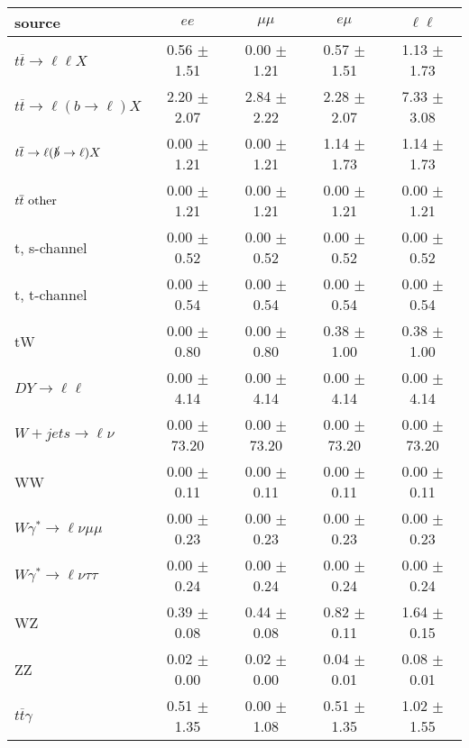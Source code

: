 \begin{tabular}{l|cccc} \hline\hline
source & $ee$ & $\mu\mu$ & $e\mu$ & $\ell\ell $ \\
\hline
$t\overline{t} \rightarrow \ell \ell X$ &  0.56 $\pm$  1.51 &  0.00 $\pm$  1.21 &  0.57 $\pm$  1.51 &  1.13 $\pm$  1.73 \\
$t\overline{t} \rightarrow \ell (b \rightarrow \ell) X$ &  2.20 $\pm$  2.07 &  2.84 $\pm$  2.22 &  2.28 $\pm$  2.07 &  7.33 $\pm$  3.08 \\
$t\overline{t} \rightarrow \ell (\slashed b \rightarrow \ell) X$ &  0.00 $\pm$  1.21 &  0.00 $\pm$  1.21 &  1.14 $\pm$  1.73 &  1.14 $\pm$  1.73 \\
        $t\overline{t}\ \rm{other}$ &  0.00 $\pm$  1.21 &  0.00 $\pm$  1.21 &  0.00 $\pm$  1.21 &  0.00 $\pm$  1.21 \\
\hline
                       t, s-channel &  0.00 $\pm$  0.52 &  0.00 $\pm$  0.52 &  0.00 $\pm$  0.52 &  0.00 $\pm$  0.52 \\
                       t, t-channel &  0.00 $\pm$  0.54 &  0.00 $\pm$  0.54 &  0.00 $\pm$  0.54 &  0.00 $\pm$  0.54 \\
                                 tW &  0.00 $\pm$  0.80 &  0.00 $\pm$  0.80 &  0.38 $\pm$  1.00 &  0.38 $\pm$  1.00 \\
\hline
         $DY \rightarrow \ell \ell$ &  0.00 $\pm$  4.14 &  0.00 $\pm$  4.14 &  0.00 $\pm$  4.14 &  0.00 $\pm$  4.14 \\
      $W+jets \rightarrow \ell \nu$ &  0.00 $\pm$ 73.20 &  0.00 $\pm$ 73.20 &  0.00 $\pm$ 73.20 &  0.00 $\pm$ 73.20 \\
                                 WW &  0.00 $\pm$  0.11 &  0.00 $\pm$  0.11 &  0.00 $\pm$  0.11 &  0.00 $\pm$  0.11 \\
\hline
$W\gamma^{*} \rightarrow \ell \nu \mu\mu$ &  0.00 $\pm$  0.23 &  0.00 $\pm$  0.23 &  0.00 $\pm$  0.23 &  0.00 $\pm$  0.23 \\
$W\gamma^{*} \rightarrow \ell \nu \tau\tau$ &  0.00 $\pm$  0.24 &  0.00 $\pm$  0.24 &  0.00 $\pm$  0.24 &  0.00 $\pm$  0.24 \\
                                 WZ &  0.39 $\pm$  0.08 &  0.44 $\pm$  0.08 &  0.82 $\pm$  0.11 &  1.64 $\pm$  0.15 \\
                                 ZZ &  0.02 $\pm$  0.00 &  0.02 $\pm$  0.00 &  0.04 $\pm$  0.01 &  0.08 $\pm$  0.01 \\
\hline
              $t\overline{t}\gamma$ &  0.51 $\pm$  1.35 &  0.00 $\pm$  1.08 &  0.51 $\pm$  1.35 &  1.02 $\pm$  1.55 \\

\end{tabular}

